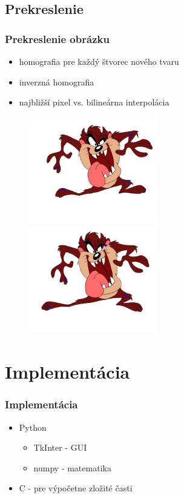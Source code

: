 \documentclass[a4paper]{beamer}
\begin{document}
\subsection{Prekreslenie}
\begin{frame}
	\frametitle{Prekreslenie obrázku}
	\begin{itemize}
		\item homografia pre každý štvorec nového tvaru
		\item inverzná homografia
		\item najbližší pixel vs. bilineárna interpolácia
	\end{itemize}

	\begin{figure}
		\centering
		\includegraphics[width=0.5\textwidth,keepaspectratio]{pic/taz_round.jpg}
		\includegraphics[width=0.5\textwidth,keepaspectratio]{pic/taz_bilin.jpg}
	\end{figure}
\end{frame}

\section{Implementácia}
\begin{frame}
	\frametitle{Implementácia}
	\begin{itemize}
		\item Python
		\begin{itemize}
			\item TkInter - GUI
			\item numpy - matematika
		\end{itemize}
		\item C - pre výpočetne zložité časti
	\end{itemize}
\end{frame}
\end{document}
